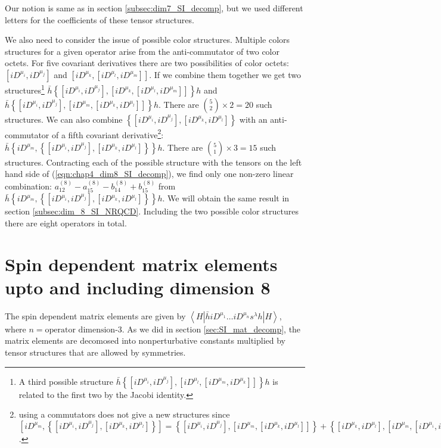 Our notion is same as in section \ref{subsec:dim7_SI_decomp}, but we used different letters for the coefficients of these tensor structures. \par
We also need to consider the issue of possible color structures.  Multiple colors structures for a given operator arise from the anti-commutator of two color octets. For five covariant derivatives there are two possibilities of color octets: $[iD^{\mu_i},iD^{\mu_j}]$ and $[iD^{\mu_k},[iD^{\mu_l},iD^{\mu_m}]]$. If we combine them together we get two structures\footnote{A third possible structure $\bar h\left\{[iD^{\mu_i},iD^{\mu_j}],[iD^{\mu_l},[iD^{\mu_m},iD^{\mu_k}]]\right\}h$ is related to the first two by the Jacobi identity.}  $\bar h\left\{[iD^{\mu_i},iD^{\mu_j}],[iD^{\mu_k},[iD^{\mu_l},iD^{\mu_m}]]\right\}h$ and $\bar h\left\{[iD^{\mu_i},iD^{\mu_j}],[iD^{\mu_m},[iD^{\mu_k},iD^{\mu_l}]]\right\}h$. There are $ {5 \choose 2}\times 2=20$ such structures. We can also combine $\left\{[iD^{\mu_i},iD^{\mu_j}],[iD^{\mu_k},iD^{\mu_l}]\right\}$ with an anti-commutator of a fifth covariant derivative\footnote{using a commutators does not give a new structures since $[iD^{\mu_m},\left\{[iD^{\mu_i},iD^{\mu_j}],[iD^{\mu_k},iD^{\mu_l}]\right\}]=\left\{[iD^{\mu_i},iD^{\mu_j}],[iD^{\mu_m},[iD^{\mu_k},iD^{\mu_l}]]\right\}+\left\{[iD^{\mu_k},iD^{\mu_l}],[iD^{\mu_m},[iD^{\mu_i},iD^{\mu_j}]]\right\}$.}: $\bar h\left\{iD^{\mu_m},\left\{[iD^{\mu_i},iD^{\mu_j}],[iD^{\mu_k},iD^{\mu_l}]\right\}\right\}h$. There are $ {5 \choose 1}\times 3=15$ such structures.  Contracting each of the possible structure with the tensors on the left hand side of (\ref{eqn:chap4_dim8_SI_decomp}), we find  only one non-zero linear combination: $a^{(8)}_{12} - a^{(8)}_{15} - b^{(8)}_{14} + b^{(8)}_{15}$ from $\bar h\left\{iD^{\mu_m},\left\{[iD^{\mu_i},iD^{\mu_j}],[iD^{\mu_k},iD^{\mu_l}]\right\}\right\}h$. We will obtain the same result in section \ref{subsec:dim_8_SI_NRQCD}. Including the two possible color structures there are eight operators in total.   
 
\section{Spin dependent matrix elements upto and including dimension 8}\label{sec:SD_mat_decomp}
The spin dependent matrix elements are given by $\left\langle H\left|\bar{h} i D^{\mu_{1}} \ldots i D^{\mu_{n}} s^{\lambda} h\right| H\right\rangle$, where $n=\text{operator dimension-3}$. As we did in section \ref{sec:SI_mat_decomp}, the matrix elements are decomosed into nonperturbative constants multiplied by tensor structures that are allowed by symmetries. 
